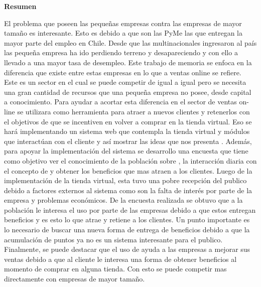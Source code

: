 \newpage

{\bf \Huge Resumen}

El problema que poseen las pequeñas empresas contra las empresas de mayor tamaño es interesante. Esto es debido
a que son las PyMe las que entregan la mayor parte del empleo en Chile. Desde que las multinacionales ingresaron
al país las pequeña empresa ha ido perdiendo terreno y desapareciendo y con ello a llevado a una mayor tasa de 
desempleo.
Este trabajo de memoria se enfoca en la diferencia que existe entre estas empresas en lo que a ventas online
se refiere. Este es un sector en el cual se puede competir de igual a igual pero se necesita una gran cantidad de 
recursos que una pequeña empresa no posee, desde capital a conocimiento. 
Para ayudar a acortar esta diferencia en el sector de ventas on-line se utilizara {\gam} como herramienta para
atraer a nuevos clientes y retenerlos con el objetivos de que se incentiven en volver a comprar en la tienda virtual. 
Eso se hará implementando un sistema web que contempla la tienda virtual y módulos que interactúan con el cliente 
y así mostrar las ideas que nos presenta {\gam}. Además, para apoyar la implementación del sistema se desarrollo
una encuesta que tiene como objetivo ver el conocimiento de la población sobre {\gam}, la interacción diaria con el 
concepto de {\gam} y obtener los beneficios que mas atraen a los clientes.
Luego de la implementación de la tienda virtual, esta tuvo una pobre recepción del publico debido a factores
externos al sistema como son la falta de interés por parte de la empresa y problemas económicos. De la encuesta
realizada se obtuvo que a la población le interesa el uso {\gam} por parte de las empresas debido a que estos
entregan beneficios y es esto lo que atrae y retiene a los clientes. Un punto importante es lo necesario
de buscar una nueva forma de entrega de beneficios debido a que la acumulación de puntos ya no es un sistema 
interesante para el publico.
Finalmente, se puede destacar que el uso de {\gam} ayuda a las empresas a mejorar sus ventas debido a que al 
cliente le interesa una forma de obtener beneficios al momento de comprar en alguna tienda. Con esto se puede
competir mas directamente con empresas de mayor tamaño.
